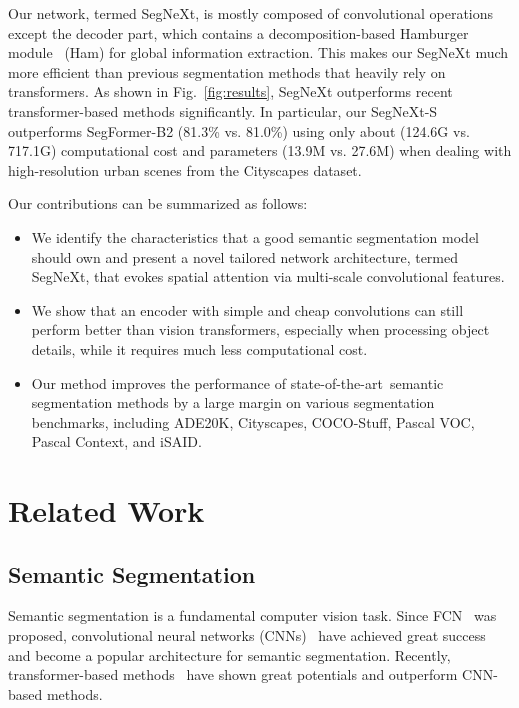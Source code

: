 \documentclass{article}
\def\sArt{state-of-the-art~}
\newcommand{\figref}[1]{Fig.~\ref{#1}}
\begin{document}
Our network, termed SegNeXt, 
is mostly composed of convolutional operations except the decoder part, 
which contains a decomposition-based Hamburger module~\cite{geng2021attention} (Ham) for global information extraction.
This makes our SegNeXt much more efficient than previous segmentation methods that heavily rely on transformers.
As shown in \figref{fig:results},
SegNeXt outperforms recent transformer-based methods significantly.
In particular, our SegNeXt-S outperforms SegFormer-B2 (81.3\% vs. 81.0\%) 
using only about  (124.6G vs. 717.1G) computational cost and 
 parameters (13.9M vs. 27.6M)
when dealing with high-resolution urban scenes from the Cityscapes dataset.


Our contributions can be summarized as follows:

\begin{itemize}
\item We identify the characteristics that a good semantic segmentation model should own and present a novel tailored network architecture, termed SegNeXt, that evokes spatial attention via multi-scale convolutional features.
\item We show that an encoder with simple and cheap convolutions can still perform better than vision transformers, especially when processing object details, while it requires much less computational cost.
\item Our method improves the performance of \sArt semantic segmentation methods by a large margin on various segmentation benchmarks, including ADE20K, Cityscapes, COCO-Stuff, Pascal VOC, Pascal Context, and iSAID. 
\end{itemize} 




\section{Related Work}


\subsection{Semantic Segmentation}

Semantic segmentation is a fundamental computer vision task. 
Since FCN~\cite{long2015fully} was proposed, {convolutional neural networks (CNNs)~\cite{badrinarayanan2017segnet,ronneberger2015u,yu2015multi,zhao2017pyramid,fu2019dual,yuan2020object,wang2020deep,pami21Res2net,li2020gated} have 
achieved great success and become a popular architecture for semantic segmentation.
Recently, transformer-based methods~\cite{zheng2021rethinking,xie2021segformer,yuan2021hrformer,strudel2021segmenter,ranftl2021vision,li2022video,cheng2021maskformer,cheng2021mask2former} have shown 
great potentials and outperform CNN-based methods. }
\end{document}
